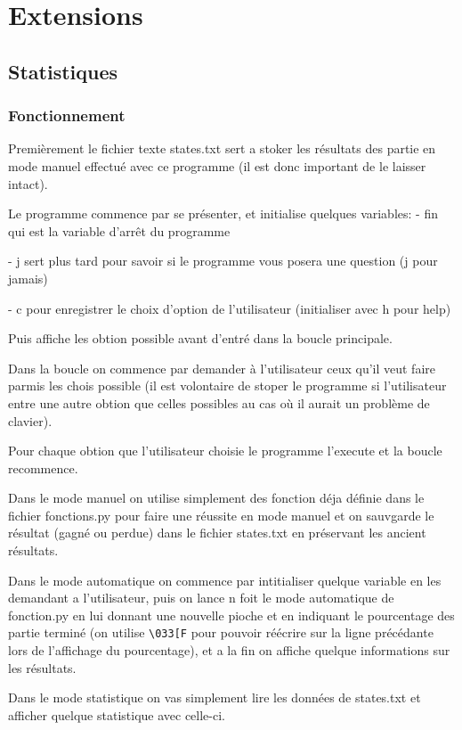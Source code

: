\documentclass{scrartcl}
\newcommand{\ts}[1]{{\fontfamily{pcr}\selectfont #1}}
\begin{document}
\section{Extensions}
\subsection{Statistiques}\label{subsec:stats}
\subsubsection{Fonctionnement}
Premièrement le fichier texte \ts{states.txt} sert a stoker les résultats des partie en mode manuel effectué avec ce programme (il est donc important de le laisser intact).

Le programme commence par se présenter, et initialise quelques variables:
- \ts{fin} qui est la variable d'arrêt du programme 

- \ts{j} sert plus tard pour savoir si le programme vous posera une question (j pour jamais)

- \ts{c} pour enregistrer le choix d'option de l'utilisateur (initialiser avec \ts{h} pour help)

Puis affiche les obtion possible avant d'entré dans la boucle principale.

Dans la boucle on commence par demander à l'utilisateur ceux qu'il veut faire parmis les chois possible (il est volontaire de stoper le programme si l'utilisateur entre une autre obtion que celles possibles au cas où il aurait un problème de clavier).

Pour chaque obtion que l'utilisateur choisie le programme l'execute et la boucle recommence.

Dans le mode manuel on utilise simplement des fonction déja définie dans le fichier fonctions.py pour faire une réussite en mode manuel et on sauvgarde le résultat (gagné ou perdue) dans le fichier \ts{states.txt} en préservant les ancient résultats.

Dans le mode automatique on commence par intitialiser quelque variable en les demandant a l'utilisateur, puis on lance n foit le mode automatique de \ts{fonction.py} en lui donnant une nouvelle pioche et en indiquant le pourcentage des partie terminé (on utilise {\selectfont \verb+\033[F+} pour pouvoir réécrire sur la ligne précédante lors de l'affichage du pourcentage), et a la fin on affiche quelque informations sur les résultats.

Dans le mode statistique on vas simplement lire les données de \ts{states.txt} et afficher quelque statistique avec celle-ci.
\end{document}
